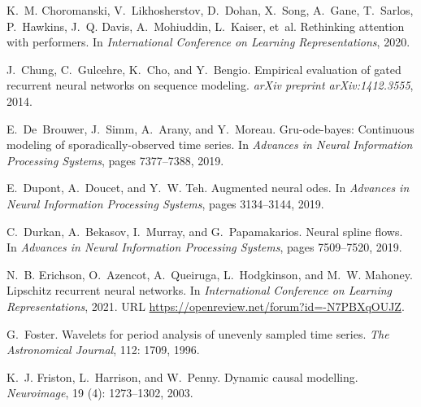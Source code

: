 \documentclass{MITcsail}
\begin{document}
\begin{thebibliography}{96}
K.~M. Choromanski, V.~Likhosherstov, D.~Dohan, X.~Song, A.~Gane, T.~Sarlos,
  P.~Hawkins, J.~Q. Davis, A.~Mohiuddin, L.~Kaiser, et~al.
\newblock Rethinking attention with performers.
\newblock In \emph{International Conference on Learning Representations}, 2020.

J.~Chung, C.~Gulcehre, K.~Cho, and Y.~Bengio.
\newblock Empirical evaluation of gated recurrent neural networks on sequence
  modeling.
\newblock \emph{arXiv preprint arXiv:1412.3555}, 2014.

E.~De~Brouwer, J.~Simm, A.~Arany, and Y.~Moreau.
\newblock Gru-ode-bayes: Continuous modeling of sporadically-observed time
  series.
\newblock In \emph{Advances in Neural Information Processing Systems}, pages
  7377--7388, 2019.

E.~Dupont, A.~Doucet, and Y.~W. Teh.
\newblock Augmented neural odes.
\newblock In \emph{Advances in Neural Information Processing Systems}, pages
  3134--3144, 2019.

C.~Durkan, A.~Bekasov, I.~Murray, and G.~Papamakarios.
\newblock Neural spline flows.
\newblock In \emph{Advances in Neural Information Processing Systems}, pages
  7509--7520, 2019.

N.~B. Erichson, O.~Azencot, A.~Queiruga, L.~Hodgkinson, and M.~W. Mahoney.
\newblock Lipschitz recurrent neural networks.
\newblock In \emph{International Conference on Learning Representations}, 2021.
\newblock URL \url{https://openreview.net/forum?id=-N7PBXqOUJZ}.

G.~Foster.
\newblock Wavelets for period analysis of unevenly sampled time series.
\newblock \emph{The Astronomical Journal}, 112: 1709, 1996.

K.~J. Friston, L.~Harrison, and W.~Penny.
\newblock Dynamic causal modelling.
\newblock \emph{Neuroimage}, 19 (4): 1273--1302, 2003.


\end{thebibliography}
\end{document}

